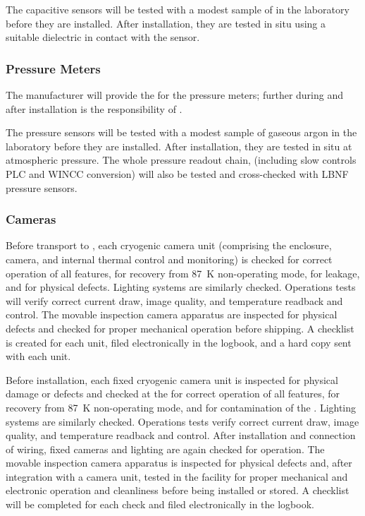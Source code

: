 The capacitive sensors will be tested with a modest sample of  in the laboratory before they are installed. After installation, they are tested in situ %
using a suitable dielectric in contact with the sensor.

\subsubsection{Pressure Meters}
\label{sec:fdgen-slow-cryo-qc-press}
The manufacturer will provide the  for the pressure meters; further  during and after installation is the responsibility of .

The pressure sensors will be tested with a modest sample of gaseous argon in the laboratory before they are installed. After installation, they are tested in situ at atmospheric pressure. The whole pressure readout chain, (including slow controls PLC and WINCC conversion) will also be tested and cross-checked with LBNF pressure sensors.

\subsubsection{Cameras}
\label{sec:fdgen-slow-cryo-qc-c}

Before %
transport to \surf, each cryogenic camera unit (comprising the enclosure, camera, and internal thermal control and monitoring) %
is checked for correct operation of all features, for recovery from \SI{87}{K} non-operating mode, for leakage, and for physical defects. Lighting systems %
are similarly checked. Operations tests will verify correct current draw, image quality, and temperature readback and control. The movable inspection camera apparatus %
are inspected for physical defects and checked for proper mechanical operation before shipping. A checklist %
is created for each unit, filed electronically in the  logbook, and a hard copy sent with each unit. 

Before installation, each fixed cryogenic camera unit is inspected for physical damage or defects and checked at the 
for correct operation of all features, for recovery from \SI{87}{K} non-operating mode, and for contamination of the . Lighting systems are similarly checked. Operations tests verify correct current draw, image quality, and temperature readback and control. After installation and connection of wiring, fixed cameras and lighting are again  checked for operation. The movable inspection camera apparatus is inspected for physical defects and, after integration with a camera unit, tested in the facility for proper mechanical and electronic operation and cleanliness before being installed or stored. A checklist will be completed for each  check and filed electronically in the  logbook. 

